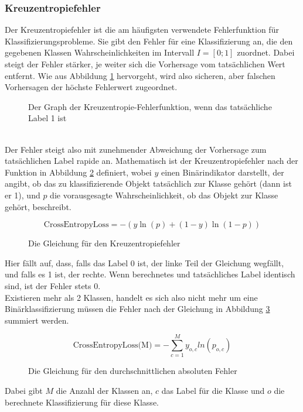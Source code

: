 \documentclass[11pt]{article}
\begin{document}
\subsubsection{Kreuzentropiefehler}
Der Kreuzentropiefehler ist die am häufigsten verwendete Fehlerfunktion für Klassifizierungsprobleme. Sie gibt den Fehler für eine Klassifizierung an, die den gegebenen Klassen Wahrscheinlichkeiten im Intervall $I=[0;1]$ zuordnet. Dabei steigt der Fehler stärker, je weiter sich die Vorhersage vom tatsächlichen Wert entfernt. Wie aus Abbildung \ref{CEL_Graph} hervorgeht, wird also sicheren, aber falschen Vorhersagen der höchste Fehlerwert zugeordnet. 
\begin{figure}[h]
	\begin{center}
	\end{center}
	\caption{Der Graph der Kreuzentropie-Fehlerfunktion, wenn das tatsächliche Label 1 ist}
	\label{CEL_Graph}
\end{figure}
\\
Der Fehler steigt also mit zunehmender Abweichung der Vorhersage zum tatsächlichen Label rapide an.\newline 
Mathematisch ist der Kreuzentropiefehler nach der Funktion in Abbildung \ref{CEL_Function} definiert, wobei $y$ einen Binärindikator darstellt, der angibt, ob das zu klassifizierende Objekt tatsächlich zur Klasse gehört (dann ist er 1), und $p$ die vorausgesagte Wahrscheinlichkeit, ob das Objekt zur Klasse gehört, beschreibt.
\begin{figure}[h]
	\begin{equation*}
	\textrm{CrossEntropyLoss}=-(y\ln(p)+(1-y)\ln(1-p))
	\end{equation*}
	\caption{Die Gleichung für den Kreuzentropiefehler}
	\label{CEL_Function}
\end{figure}
\newline
Hier fällt auf, dass, falls das Label 0 ist, der linke Teil der Gleichung wegfällt, und falls es 1 ist, der rechte. Wenn berechnetes und tatsächliches Label identisch sind, ist der Fehler stets 0.\\
Existieren mehr als 2 Klassen, handelt es sich also nicht mehr um eine Binärklassifizierung müssen die Fehler nach der Gleichung in Abbildung \ref{CEL_Function_cummulative} summiert werden.
\begin{figure}[h]
	\begin{equation*}
	\textrm{CrossEntropyLoss(M)}=-\sum\limits_{c=1}^My_{o,c}ln(p_{o,c})
	\end{equation*}
	\caption{Die Gleichung für den durchschnittlichen absoluten Fehler}
	\label{CEL_Function_cummulative}
\end{figure}
\newline
Dabei gibt $M$ die Anzahl der Klassen an, $c$ das Label für die Klasse und $o$ die berechnete Klassifizierung für diese Klasse.
\end{document}
